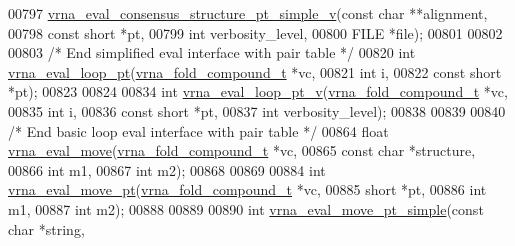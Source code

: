 \begin{DoxyCode}
00797 \mbox{\hyperlink{group__eval_gaf2d227b3d54bf9b693a3df52faf5e2e4}{vrna\_eval\_consensus\_structure\_pt\_simple\_v}}(\textcolor{keyword}{const} \textcolor{keywordtype}{char}  **alignment,
00798                                           \textcolor{keyword}{const} \textcolor{keywordtype}{short} *pt,
00799                                           \textcolor{keywordtype}{int}         verbosity\_level,
00800                                           FILE        *file);
00801 
00802 
00803 \textcolor{comment}{/* End simplified eval interface with pair table */}
00820 \textcolor{keywordtype}{int} \mbox{\hyperlink{group__eval_ga730ba4df55c02fd530a0cddd49faf760}{vrna\_eval\_loop\_pt}}(\mbox{\hyperlink{group__fold__compound_structvrna__fc__s}{vrna\_fold\_compound\_t}}  *vc,
00821                       \textcolor{keywordtype}{int}                   i,
00822                       \textcolor{keyword}{const} \textcolor{keywordtype}{short}           *pt);
00823 
00824 
00834 \textcolor{keywordtype}{int} \mbox{\hyperlink{group__eval_ga30faecaff1009fe62c58312c8d56dabb}{vrna\_eval\_loop\_pt\_v}}(\mbox{\hyperlink{group__fold__compound_structvrna__fc__s}{vrna\_fold\_compound\_t}}  *vc,
00835                         \textcolor{keywordtype}{int}                   i,
00836                         \textcolor{keyword}{const} \textcolor{keywordtype}{short}           *pt,
00837                         \textcolor{keywordtype}{int}                   verbosity\_level);
00838 
00839 
00840 \textcolor{comment}{/* End basic loop eval interface with pair table */}
00864 \textcolor{keywordtype}{float} \mbox{\hyperlink{group__eval_gaff1b9e4f4d17b434b0a822fe783672c1}{vrna\_eval\_move}}(\mbox{\hyperlink{group__fold__compound_structvrna__fc__s}{vrna\_fold\_compound\_t}} *vc,
00865                      \textcolor{keyword}{const} \textcolor{keywordtype}{char}           *structure,
00866                      \textcolor{keywordtype}{int}                  m1,
00867                      \textcolor{keywordtype}{int}                  m2);
00868 
00869 
00884 \textcolor{keywordtype}{int} \mbox{\hyperlink{group__eval_ga123dabc119ea98c968a5e903cc46f0fb}{vrna\_eval\_move\_pt}}(\mbox{\hyperlink{group__fold__compound_structvrna__fc__s}{vrna\_fold\_compound\_t}}  *vc,
00885                       \textcolor{keywordtype}{short}                 *pt,
00886                       \textcolor{keywordtype}{int}                   m1,
00887                       \textcolor{keywordtype}{int}                   m2);
00888 
00889 
00890 \textcolor{keywordtype}{int} \mbox{\hyperlink{group__eval_ga8bd14b548874366b8a2a9c65eff08888}{vrna\_eval\_move\_pt\_simple}}(\textcolor{keyword}{const} \textcolor{keywordtype}{char} *\textcolor{keywordtype}{string},

\end{DoxyCode}

